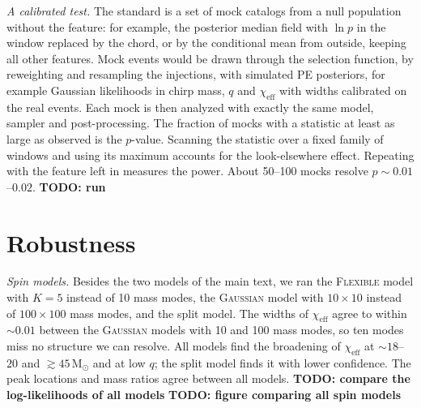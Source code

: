 \documentclass[%
 reprint,
 amsmath,amssymb,
 aps,
 prl,
 nofootinbib,nobibnotes,
 floatfix,
]{revtex4-2}
\newcommand{\Msun}{\ensuremath{\mathrm{M}_{\odot}}}
\newcommand{\chieff}{\ensuremath{\chi_{\mathrm{eff}}}}
\newcommand{\todo}[1]{{\color{Blue}\bf TODO: #1}}
\newcommand{\flexiblespins}{\textsc{Flexible}\xspace}
\newcommand{\gaussianspins}{\textsc{Gaussian}\xspace}
\begin{document}
\textit{A calibrated test.} The standard is a set of mock catalogs from a null population without the feature: for example, the posterior median field with $\ln p$ in the window replaced by the chord, or by the conditional mean from outside, keeping all other features. Mock events would be drawn through the selection function, by reweighting and resampling the injections, with simulated \ac{PE} posteriors, for example Gaussian likelihoods in chirp mass, $q$ and $\chieff$ with widths calibrated on the real events. Each mock is then analyzed with exactly the same model, sampler and post-processing. The fraction of mocks with a statistic at least as large as observed is the $p$-value. Scanning the statistic over a fixed family of windows and using its maximum accounts for the look-elsewhere effect. Repeating with the feature left in measures the power. About 50--100 mocks resolve $p \sim 0.01$--$0.02$. \todo{run}

\section{Robustness}
\label{sm: robustness}

\textit{Spin models.} Besides the two models of the main text, we ran the \flexiblespins model with $K = 5$ instead of 10 mass modes, the \gaussianspins model with $10 \times 10$ instead of $100 \times 100$ mass modes, and the split model. The widths of $\chieff$ agree to within $\sim 0.01$ between the \gaussianspins models with 10 and 100 mass modes, so ten modes miss no structure we can resolve. All models find the broadening of $\chieff$ at $\sim 18$--$20$ and $\gtrsim 45\,\Msun$ and at low $q$; the split model finds it with lower confidence. The peak locations and mass ratios agree between all models. \todo{compare the log-likelihoods of all models} \todo{figure comparing all spin models}
\end{document}
